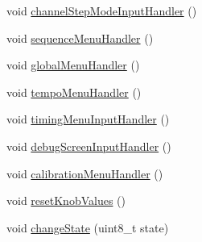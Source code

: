 \begin{DoxyCompactItemize}
\item 
void \hyperlink{class_input_module_ae5323fd937a03aff47a5696c67ca87d2}{channel\+Step\+Mode\+Input\+Handler} ()
\item 
void \hyperlink{class_input_module_a6b0c9027e4088393722d00d162e4ecd9}{sequence\+Menu\+Handler} ()
\item 
void \hyperlink{class_input_module_a9844fa2022c8e526c431cd084556ffe0}{global\+Menu\+Handler} ()
\item 
void \hyperlink{class_input_module_a2e71a13d6f8365f5753fae8f4542769c}{tempo\+Menu\+Handler} ()
\item 
void \hyperlink{class_input_module_ab5048e031568fa6879b6618e4478cc97}{timing\+Menu\+Input\+Handler} ()
\item 
void \hyperlink{class_input_module_a341016de304d4ac105a9f5c98a76a853}{debug\+Screen\+Input\+Handler} ()
\item 
void \hyperlink{class_input_module_a75dd14eb87936e206ba74ca406851201}{calibration\+Menu\+Handler} ()
\item 
void \hyperlink{class_input_module_a1bbac8d8d543c1adfdaa955f251db63a}{reset\+Knob\+Values} ()
\item 
void \hyperlink{class_input_module_ac6242c4331441ba020d2fca7bff7a401}{change\+State} (uint8\+\_\+t state)
\end{DoxyCompactItemize}
